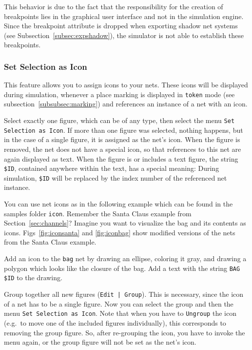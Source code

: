 This behavior is due to the fact that
the responsibility for the creation of breakpoints lies in the
graphical user interface and not in the simulation engine. Since
the breakpoint attribute is dropped when exporting shadow net
systems (see Subsection~\ref{subsec:expshadow}), the 
simulator is not able to establish these breakpoints.

\subsubsection{Set Selection as Icon}
\label{subsubsec:icon}

This feature allows you to assign icons to your nets.
These icons will be displayed during simulation, whenever
a place marking is displayed in \texttt{token} mode
(see subsection~\ref{subsubsec:marking}) and
references an instance of a net
with an icon.

Select exactly one figure, which can be of any type, then select the
menu \texttt{Set Selection as Icon}.
If more than one figure was selected, nothing happens,
but in the case of a single figure, it is assigned as the
net's icon.
When the figure is removed, the net does not have a special icon, so
that references to this net are again displayed as text.
When the figure is or includes a text figure, the string
\texttt{\$ID}, contained anywhere within the text, has a special
meaning: During simulation, \texttt{\$ID} will be replaced by the
index number of the referenced net instance.

You can use net icons as in the following example which can be found
in the samples folder \texttt{icon}.
Remember the Santa Claus example from Section~\ref{sec:channels}?
Imagine you want to visualize the bag and its contents as icons.
Figs~\ref{fig:iconsanta} and \ref{fig:iconbag} show modified versions of the
nets from the Santa Claus example.


Add an icon to the \texttt{bag} net by drawing an ellipse,
coloring it gray, and drawing a polygon which looks like the closure
of the bag.
Add a text with the string \texttt{BAG \$ID} to the drawing.
\iffalse
Be careful not to connect the text to any other figure (see bug
below).
\fi
Group together all new figures (\texttt{Edit | Group}).
This is necessary, since the icon of a net has to be a single figure.
Now you can select the group and then the menu \texttt{Set Selection
as Icon}.
Note that when you have to \texttt{Ungroup} the icon (e.g.\ to move one
of the included figures individually), this corresponds to removing
the group figure. So, after re-grouping the icon, you have to invoke
the menu again, or the group figure will not be set as the net's icon.


